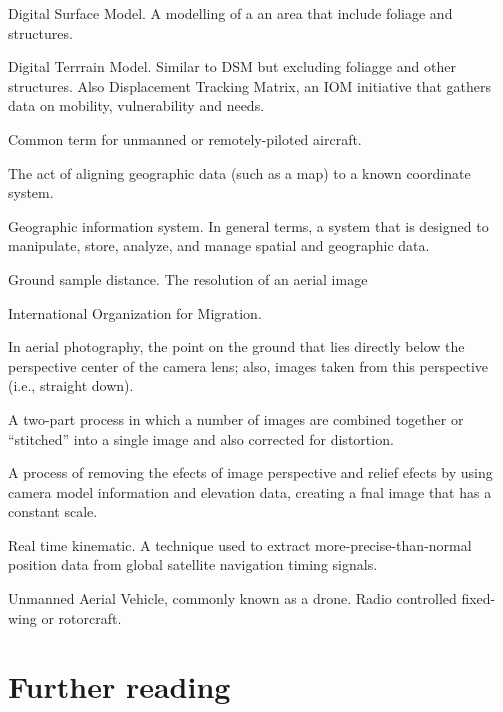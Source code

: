\documentclass[
  a4paper,
  onecolumn,
  oneside]{book}
\providecommand{\tightlist}{%
  \setlength{\itemsep}{0pt}\setlength{\parskip}{0pt}}\usepackage{longtable,booktabs,array}
\begin{document}
\begin{description}
\tightlist
\item[DSM]
Digital Surface Model. A modelling of a an area that include foliage and
structures.
\item[DTM]
Digital Terrrain Model. Similar to DSM but excluding foliagge and other
structures. Also Displacement Tracking Matrix, an IOM initiative that
gathers data on mobility, vulnerability and needs.
\item[Drone]
Common term for unmanned or remotely-piloted aircraft.
\item[Georeferencing]
The act of aligning geographic data (such as a map) to a known
coordinate system.
\item[GIS]
Geographic information system. In general terms, a system that is
designed to manipulate, store, analyze, and manage spatial and
geographic data.
\item[GSD]
Ground sample distance. The resolution of an aerial image
\item[IOM]
International Organization for Migration.
\item[Nadir]
In aerial photography, the point on the ground that lies directly below
the perspective center of the camera lens; also, images taken from this
perspective (i.e., straight down).
\item[Orthomosaic]
A two-part process in which a number of images are combined together or
``stitched'' into a single image and also corrected for distortion.
\item[Orthorectification]
A process of removing the efects of image perspective and relief efects
by using camera model information and elevation data, creating a fnal
image that has a constant scale.
\item[RTK]
Real time kinematic. A technique used to extract
more-precise-than-normal position data from global satellite navigation
timing signals.
\item[UAV]
Unmanned Aerial Vehicle, commonly known as a drone. Radio controlled
fixed-wing or rotorcraft.
\end{description}

\hypertarget{further-reading}{%
\chapter*{Further reading}\label{further-reading}}

\end{document}
